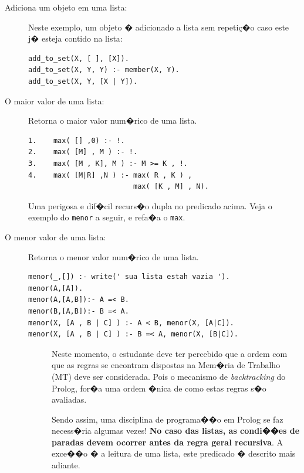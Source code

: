 \documentclass[final,a4paper]{article}
\begin{document}
\begin{description}
\newpage
\item [Adiciona um objeto em uma lista:]
Neste exemplo, um objeto � adicionado a lista
sem repeti\c{c}�o caso este j�
 esteja contido na lista:
 
\begin{verbatim}
add_to_set(X, [ ], [X]).
add_to_set(X, Y, Y) :- member(X, Y).
add_to_set(X, Y, [X | Y]).
\end{verbatim}



\newpage
\item [O maior valor de uma lista:] 
Retorna o maior valor num�rico de uma lista.

\begin{verbatim}
1.    max( [] ,0) :- !.
2.    max( [M] , M ) :- !.
3.    max( [M , K], M ) :- M >= K , !.
4.    max( [M|R] ,N ) :- max( R , K ) ,
                         max( [K , M] , N).
\end{verbatim}

 Uma perigosa e dif�cil recurs�o dupla no predicado acima.
Veja o exemplo do \texttt{menor} a seguir, e refa�a o \texttt{max}.

\item [O menor valor de uma lista:] 
Retorna o menor valor num�rico de uma lista.

\begin{verbatim}
menor(_,[]) :- write(' sua lista estah vazia ').
menor(A,[A]).
menor(A,[A,B]):- A =< B.
menor(B,[A,B]):- B =< A.
menor(X, [A , B | C] ) :- A < B, menor(X, [A|C]).
menor(X, [A , B | C] ) :- B =< A, menor(X, [B|C]).
\end{verbatim}







\begin{description}




\item[] Neste momento, o estudante deve ter percebido que a ordem com que as regras se encontram dispostas na Mem�ria de Trabalho (MT) deve ser considerada. Pois o mecanismo de {\em backtracking} do Prolog, for�a uma ordem �nica de como estas regras s�o avaliadas.

\item[] Sendo assim, uma disciplina de programa��o em Prolog
se faz necess�ria algumas vezes! {\bf No caso das listas,  as
condi��es de paradas devem ocorrer antes da regra geral recursiva}.
A exce��o � a leitura de uma lista, este predicado � descrito mais adiante.


\end{description}
\end{description}
\end{document}
